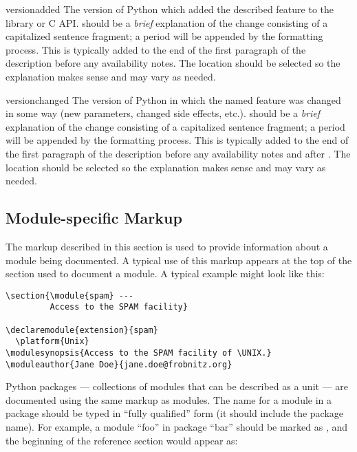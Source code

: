 \documentclass{howto}
\begin{document}
    \begin{macrodesc}{versionadded}{}
      The version of Python which added the described feature to the
      library or C API.   should be a \emph{brief}
      explanation of the change consisting of a capitalized sentence
      fragment; a period will be appended by the formatting process.
      This is typically added to the end of the first paragraph of the
      description before any availability notes.  The location should
      be selected so the explanation makes sense and may vary as
      needed.
    \end{macrodesc}

    \begin{macrodesc}{versionchanged}{}
      The version of Python in which the named feature was changed in
      some way (new parameters, changed side effects, etc.).
       should be a \emph{brief} explanation of the
      change consisting of a capitalized sentence fragment; a
      period will be appended by the formatting process.
      This is typically added to the end of the first paragraph of the
      description before any availability notes and after
      .  The location should be selected so the
      explanation makes sense and may vary as needed.
    \end{macrodesc}


  \subsection{Module-specific Markup}

  The markup described in this section is used to provide information
  about a module being documented.  A typical use of this markup
  appears at the top of the section used to document a module.  A
  typical example might look like this:

\begin{verbatim}
\section{\module{spam} ---
         Access to the SPAM facility}

\declaremodule{extension}{spam}
  \platform{Unix}
\modulesynopsis{Access to the SPAM facility of \UNIX.}
\moduleauthor{Jane Doe}{jane.doe@frobnitz.org}
\end{verbatim}

  Python packages --- collections of modules that can
  be described as a unit --- are documented using the same markup as
  modules.  The name for a module in a package should be typed in
  ``fully qualified'' form (it should include the package name).
  For example, a module ``foo'' in package ``bar'' should be marked as
  , and the beginning of the reference
  section would appear as:
\end{document}
